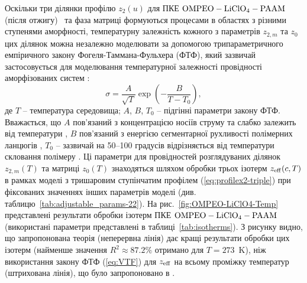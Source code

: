 \documentclass[14pt,twoside]{vakthesis}
\begin{document}
Оскільки три ділянки профілю ${z}_2(u)$ для ПКЕ $\rm OMPEO-LiClO_4-PAAM$ (після отжигу)~\cite{Wiec1994} та фаза матриці формуються процесами в областях з різними ступенями аморфності, температурну залежність кожного з параметрів ${z}_{2,m}$ та ${z}_0$ цих ділянок можна незалежно моделювати за допомогою трипараметричного емпіричного закону Фогеля-Таммана-Фульхера (ФТФ), який зазвичай застосовується для моделювання температурної залежності провідності аморфізованих систем \cite{sequera2010}:
\begin{equation}\label{eq:VTF}
	\sigma = \frac{A}{\sqrt{T}}\exp{\left( -\frac{B}{T-T_0} \right)},
\end{equation}
де $T$ -- температура середовища; $A$, $B$, $T_0$ -- підгінні параметри закону ФТФ. Вважається, що $A$ пов'язаний з концентрацією носіїв струму та слабко залежить від температури \cite{Ferry1997}, $B$ пов'язаний з енергією сегментарної рухливості полімерних ланцюгів \cite{Hou2004}, $T_0$ -- зазвичай на 50--100 градусів відрізняється від температури скловання полімеру \cite{Wiec1994}.
Ці параметри для провідностей розглядуваних ділянок ${z}_{2,m} (T)$ та матриці ${z}_0 (T)$ знаходяться шляхом обробки трьох ізотерм ${z}_{\rm eff} (c,T)$ в рамках моделі з тришаровим ступінчатим профілем (\ref{eq:profilex2-triple}) при фіксованих значеннях інших параметрів моделі (див. таблицю~\ref{tab:adjustable_params-22}). 
На рис.~\ref{fig:OMPEO-LiClO4-Temp} представлені результати обробки ізотерм ПКЕ $\rm OMPEO-LiClO_4-PAAM$~\cite{Wiec1994} (використані параметри представлені в таблиці~\ref{tab:isotherms}). З рисунку видно, що запропонована теорія (неперервна лінія) дає кращі результати обробки цих ізотерм {\color{violet}(найменше значення $R^2\approx 87.2\%$ отримано для $T=273$~K)}, ніж використання закону ФТФ (\ref{eq:VTF}) для ${z}_{\rm eff}$ на всьому проміжку температур (штрихована лінія), що було запропоновано в \cite{Wiec1994}.
\end{document}
